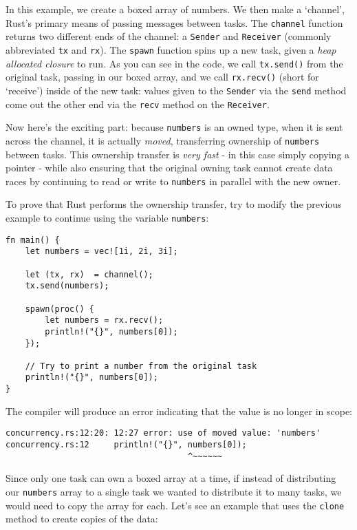 \documentclass[]{article}
\begin{document}
In this example, we create a boxed array of numbers. We then make a
`channel', Rust's primary means of passing messages between tasks. The
\texttt{channel} function returns two different ends of the channel: a
\texttt{Sender} and \texttt{Receiver} (commonly abbreviated \texttt{tx}
and \texttt{rx}). The \texttt{spawn} function spins up a new task, given
a \emph{heap allocated closure} to run. As you can see in the code, we
call \texttt{tx.send()} from the original task, passing in our boxed
array, and we call \texttt{rx.recv()} (short for `receive') inside of
the new task: values given to the \texttt{Sender} via the \texttt{send}
method come out the other end via the \texttt{recv} method on the
\texttt{Receiver}.

Now here's the exciting part: because \texttt{numbers} is an owned type,
when it is sent across the channel, it is actually \emph{moved},
transferring ownership of \texttt{numbers} between tasks. This ownership
transfer is \emph{very fast} - in this case simply copying a pointer -
while also ensuring that the original owning task cannot create data
races by continuing to read or write to \texttt{numbers} in parallel
with the new owner.

To prove that Rust performs the ownership transfer, try to modify the
previous example to continue using the variable \texttt{numbers}:

\begin{verbatim}
fn main() {
    let numbers = vec![1i, 2i, 3i];

    let (tx, rx)  = channel();
    tx.send(numbers);

    spawn(proc() {
        let numbers = rx.recv();
        println!("{}", numbers[0]);
    });

    // Try to print a number from the original task
    println!("{}", numbers[0]);
}
\end{verbatim}

The compiler will produce an error indicating that the value is no
longer in scope:

\begin{verbatim}
concurrency.rs:12:20: 12:27 error: use of moved value: 'numbers'
concurrency.rs:12     println!("{}", numbers[0]);
                                     ^~~~~~~
\end{verbatim}

Since only one task can own a boxed array at a time, if instead of
distributing our \texttt{numbers} array to a single task we wanted to
distribute it to many tasks, we would need to copy the array for each.
Let's see an example that uses the \texttt{clone} method to create
copies of the data:
\end{document}
